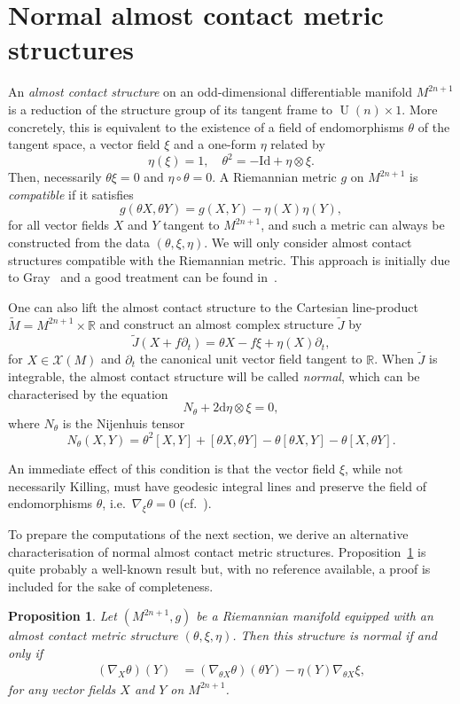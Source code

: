 \documentclass[a4paper,reqno]{amsart}
\newtheorem{proposition}[thm]{Proposition}
\theoremstyle{definition}
\theoremstyle{remark}
\theoremstyle{plain}
\numberwithin{equation}{section}
\newcommand{\calX}{{\mathcal{X}}}
\def\Unit{\operatorname {U}}
\def\Unit{\operatorname {U}}
\newcommand{\rn}{\mathbb R}
\newcommand{\tJ}{\tilde{J}}
\begin{document}
\section{Normal almost contact metric structures} \label{sec2}

An {\em almost contact structure} on an odd-dimensional
differentiable manifold $M^{2n+1}$ is a reduction of the
structure group of its tangent frame  to $\Unit(n) \times 1$. More
concretely, this is equivalent to the existence of a field of
endomorphisms $\theta$ of the tangent space, a vector field $\xi$
and a one-form $\eta$ related by
$$ \eta (\xi) =1 , \quad \theta^2 = - \mathrm{Id} + \eta\otimes \xi .$$
Then, necessarily $\theta \xi =0$ and $\eta\circ \theta =0$.
A Riemannian metric $g$ on $M^{2n+1}$ is {\em compatible} if it satisfies
$$ g(\theta X, \theta Y) = g(X,Y) - \eta(X)\eta(Y) ,$$
for all vector fields $X$ and $Y$ tangent to $M^{2n+1}$, and such a
metric can always be constructed from the data
$(\theta ,\xi,\eta)$. We will only consider almost contact
structures compatible with the Riemannian metric. This approach
is initially due to Gray~\cite{Gray} and a good treatment can be
found in~\cite{Blair}.


One can also lift the almost contact structure to the Cartesian
line-product $\tilde{M} = M^{2n+1}\times \rn$ and construct an
almost complex structure $\tJ$ by 
$$
\tJ(X +f\partial_t)= \theta X -f \xi +\eta (X)\partial_t,
$$ 
for $X\in \calX(M)$ and $\partial_t$ the canonical unit vector field
tangent to $\rn$.  When $\tJ$ is integrable, the almost contact
structure will be called {\em normal}, which can be characterised
by the equation
$$
N_{\theta} + 2\textrm{d}\eta \otimes \xi =0,
$$
where $N_{\theta}$ is the Nijenhuis tensor
$$N_{\theta}(X,Y)= \theta^2 [X,Y] + [\theta X,\theta Y] - \theta
[\theta X,Y] - \theta [X,\theta Y].$$ 

An immediate effect of this condition is that the vector field
$\xi$, while not necessarily Killing, must have  geodesic integral
lines and preserve the field of endomorphisms $\theta$,
i.e.~$\nabla_{\xi}\theta =0$ (cf.~\cite{Blair}).


To prepare the computations of the next section, we derive an
alternative characterisation of normal almost contact metric
structures. Proposition~\ref{prop1} is quite probably a well-known result but, with no reference available, a proof is included for the sake of completeness.

\begin{proposition}\label{prop1}
  Let $(M^{2n+1},g)$ be a Riemannian manifold equipped with an
  almost contact metric structure $(\theta,\xi,\eta)$.  Then this
  structure is normal if and only if
\begin{align*}
(\nabla_X \theta) (Y)  &= (\nabla_{\theta X} \theta) (\theta Y)
                         - \eta(Y)\nabla_{\theta X} \xi, 
\end{align*} 
for any vector fields $X$ and $Y$ on $M^{2n+1}$.
\end{proposition}
\end{document}
